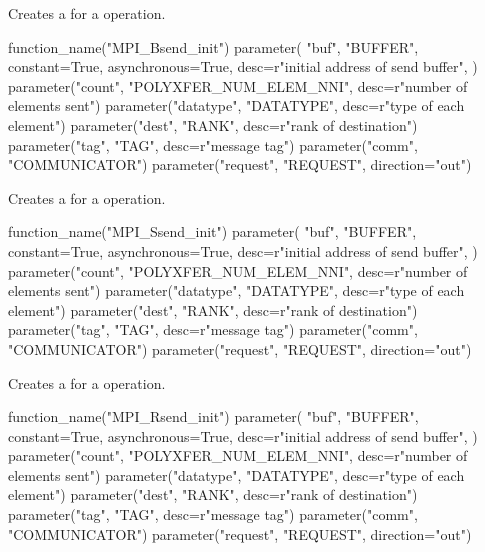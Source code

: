 Creates a 
for a  operation.

\begin{mpi-binding}
    function_name("MPI_Bsend_init")
    parameter(
        "buf",
        "BUFFER",
        constant=True,
        asynchronous=True,
        desc=r"initial address of send buffer",
    )
    parameter("count", "POLYXFER_NUM_ELEM_NNI", desc=r"number of elements sent")
    parameter("datatype", "DATATYPE", desc=r"type of each element")
    parameter("dest", "RANK", desc=r"rank of destination")
    parameter("tag", "TAG", desc=r"message tag")
    parameter("comm", "COMMUNICATOR")
    parameter("request", "REQUEST", direction="out")
\end{mpi-binding}

Creates a 
for a  operation.

\begin{mpi-binding}
    function_name("MPI_Ssend_init")
    parameter(
        "buf",
        "BUFFER",
        constant=True,
        asynchronous=True,
        desc=r"initial address of send buffer",
    )
    parameter("count", "POLYXFER_NUM_ELEM_NNI", desc=r"number of elements sent")
    parameter("datatype", "DATATYPE", desc=r"type of each element")
    parameter("dest", "RANK", desc=r"rank of destination")
    parameter("tag", "TAG", desc=r"message tag")
    parameter("comm", "COMMUNICATOR")
    parameter("request", "REQUEST", direction="out")
\end{mpi-binding}

Creates a 
for a  operation.

\begin{mpi-binding}
    function_name("MPI_Rsend_init")
    parameter(
        "buf",
        "BUFFER",
        constant=True,
        asynchronous=True,
        desc=r"initial address of send buffer",
    )
    parameter("count", "POLYXFER_NUM_ELEM_NNI", desc=r"number of elements sent")
    parameter("datatype", "DATATYPE", desc=r"type of each element")
    parameter("dest", "RANK", desc=r"rank of destination")
    parameter("tag", "TAG", desc=r"message tag")
    parameter("comm", "COMMUNICATOR")
    parameter("request", "REQUEST", direction="out")
\end{mpi-binding}

